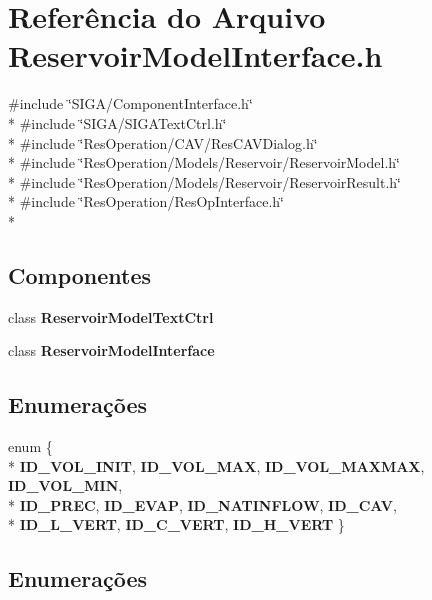 \section{Referência do Arquivo Reservoir\+Model\+Interface.\+h}
\label{_reservoir_model_interface_8h}
{\ttfamily \#include \char`\"{}S\+I\+G\+A/\+Component\+Interface.\+h\char`\"{}}\\*
{\ttfamily \#include \char`\"{}S\+I\+G\+A/\+S\+I\+G\+A\+Text\+Ctrl.\+h\char`\"{}}\\*
{\ttfamily \#include \char`\"{}Res\+Operation/\+C\+A\+V/\+Res\+C\+A\+V\+Dialog.\+h\char`\"{}}\\*
{\ttfamily \#include \char`\"{}Res\+Operation/\+Models/\+Reservoir/\+Reservoir\+Model.\+h\char`\"{}}\\*
{\ttfamily \#include \char`\"{}Res\+Operation/\+Models/\+Reservoir/\+Reservoir\+Result.\+h\char`\"{}}\\*
{\ttfamily \#include \char`\"{}Res\+Operation/\+Res\+Op\+Interface.\+h\char`\"{}}\\*
\subsection*{Componentes}
\begin{DoxyCompactItemize}
\item 
class {\bf Reservoir\+Model\+Text\+Ctrl}
\item 
class {\bf Reservoir\+Model\+Interface}
\end{DoxyCompactItemize}
\subsection*{Enumerações}
\begin{DoxyCompactItemize}
\item 
enum \{ \\*
{\bf I\+D\+\_\+\+V\+O\+L\+\_\+\+I\+N\+IT}, 
{\bf I\+D\+\_\+\+V\+O\+L\+\_\+\+M\+AX}, 
{\bf I\+D\+\_\+\+V\+O\+L\+\_\+\+M\+A\+X\+M\+AX}, 
{\bf I\+D\+\_\+\+V\+O\+L\+\_\+\+M\+IN}, 
\\*
{\bf I\+D\+\_\+\+P\+R\+EC}, 
{\bf I\+D\+\_\+\+E\+V\+AP}, 
{\bf I\+D\+\_\+\+N\+A\+T\+I\+N\+F\+L\+OW}, 
{\bf I\+D\+\_\+\+C\+AV}, 
\\*
{\bf I\+D\+\_\+\+L\+\_\+\+V\+E\+RT}, 
{\bf I\+D\+\_\+\+C\+\_\+\+V\+E\+RT}, 
{\bf I\+D\+\_\+\+H\+\_\+\+V\+E\+RT}
 \}
\end{DoxyCompactItemize}


\subsection{Enumerações}
